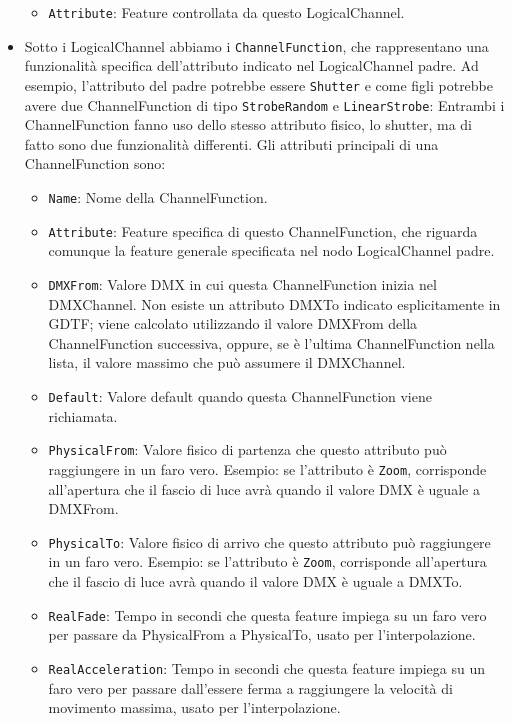\documentclass[main.tex]{subfiles}
\begin{document}
\begin{itemize}
\begin{itemize}
            \item \lstinline{Attribute}: Feature controllata da questo LogicalChannel.
        \end{itemize}
    \item Sotto i LogicalChannel abbiamo i \lstinline{ChannelFunction}, che rappresentano una funzionalità specifica dell'attributo indicato nel LogicalChannel padre. Ad esempio, l'attributo del padre potrebbe essere \lstinline{Shutter} e come figli potrebbe avere due ChannelFunction di tipo \lstinline{StrobeRandom} e \lstinline{LinearStrobe}: Entrambi i ChannelFunction fanno uso dello stesso attributo fisico, lo shutter, ma di fatto sono due funzionalità differenti. Gli attributi principali di una ChannelFunction sono: \begin{itemize}
            \item \lstinline{Name}: Nome della ChannelFunction.
            \item \lstinline{Attribute}: Feature specifica di questo ChannelFunction, che riguarda comunque la feature generale specificata nel nodo LogicalChannel padre.
            \item \lstinline{DMXFrom}: Valore DMX in cui questa ChannelFunction inizia nel DMXChannel. Non esiste un attributo DMXTo indicato esplicitamente in GDTF; viene calcolato utilizzando il valore DMXFrom della ChannelFunction successiva, oppure, se è l'ultima ChannelFunction nella lista, il valore massimo che può assumere il DMXChannel.
            \item \lstinline{Default}: Valore default quando questa ChannelFunction viene richiamata.
            \item \lstinline{PhysicalFrom}: Valore fisico di partenza che questo attributo può raggiungere in un faro vero. Esempio: se l'attributo è \lstinline{Zoom}, corrisponde all'apertura che il fascio di luce avrà quando il valore DMX è uguale a DMXFrom.
            \item \lstinline{PhysicalTo}: Valore fisico di arrivo che questo attributo può raggiungere in un faro vero. Esempio: se l'attributo è \lstinline{Zoom}, corrisponde all'apertura che il fascio di luce avrà quando il valore DMX è uguale a DMXTo.
            \item \lstinline{RealFade}: Tempo in secondi che questa feature impiega su un faro vero per passare da PhysicalFrom a PhysicalTo, usato per l'interpolazione.
            \item \lstinline{RealAcceleration}: Tempo in secondi che questa feature impiega su un faro vero per passare dall'essere ferma a raggiungere la velocità di movimento massima, usato per l'interpolazione.

\end{itemize}
\end{itemize}
\end{document}
